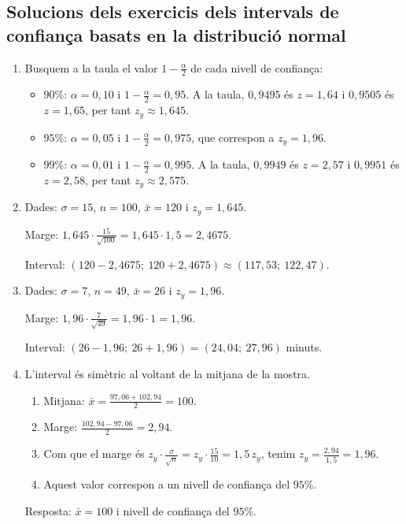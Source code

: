 \subsection{Solucions dels exercicis dels intervals de confiança basats en la distribució normal}
\begin{enumerate}
 \item Busquem a la taula el valor $1-\frac{\alpha}{2}$ de cada nivell de confiança:
 \begin{itemize}
  \item $90\%$: $\alpha=0{,}10$ i $1-\frac{\alpha}{2}=0{,}95$. A la taula, $0{,}9495$ és $z=1{,}64$ i $0{,}9505$ és $z=1{,}65$, per tant $z_y\approx1{,}645$.
  \item $95\%$: $\alpha=0{,}05$ i $1-\frac{\alpha}{2}=0{,}975$, que correspon a $z_y=1{,}96$.
  \item $99\%$: $\alpha=0{,}01$ i $1-\frac{\alpha}{2}=0{,}995$. A la taula, $0{,}9949$ és $z=2{,}57$ i $0{,}9951$ és $z=2{,}58$, per tant $z_y\approx2{,}575$.
 \end{itemize}

 \item Dades: $\sigma=15$, $n=100$, $\bar{x}=120$ i $z_y=1{,}645$.

 Marge: $1{,}645\cdot\frac{15}{\sqrt{100}}=1{,}645\cdot1{,}5=2{,}4675$.

 Interval: $(120-2{,}4675;\ 120+2{,}4675)\approx(117{,}53;\ 122{,}47)$.

 \item Dades: $\sigma=7$, $n=49$, $\bar{x}=26$ i $z_y=1{,}96$.

 Marge: $1{,}96\cdot\frac{7}{\sqrt{49}}=1{,}96\cdot1=1{,}96$.

 Interval: $(26-1{,}96;\ 26+1{,}96)=(24{,}04;\ 27{,}96)$ minuts.

 \item L'interval és simètric al voltant de la mitjana de la mostra.
 \begin{enumerate}[(1)]
  \item Mitjana: $\bar{x}=\frac{97{,}06+102{,}94}{2}=100$.
  \item Marge: $\frac{102{,}94-97{,}06}{2}=2{,}94$.
  \item Com que el marge és $z_y\cdot\frac{\sigma}{\sqrt{n}}=z_y\cdot\frac{15}{10}=1{,}5\,z_y$, tenim $z_y=\frac{2{,}94}{1{,}5}=1{,}96$.
  \item Aquest valor correspon a un nivell de confiança del $95\%$.
 \end{enumerate}
 Resposta: $\bar{x}=100$ i nivell de confiança del $95\%$.


\end{enumerate}
